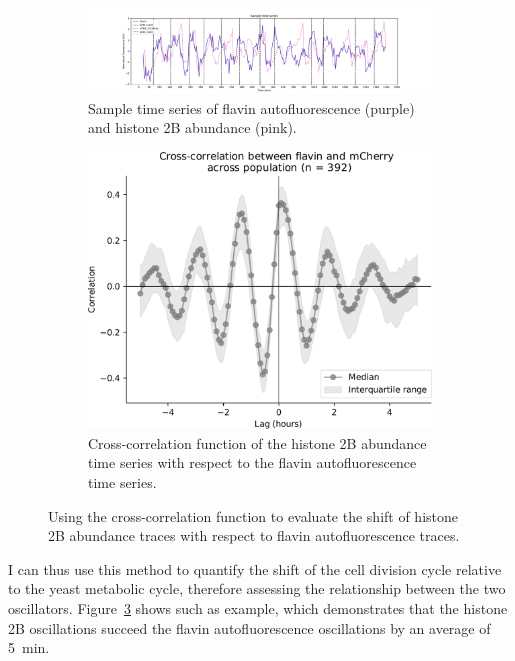 \begin{figure}
  \centering
  \begin{subfigure}[t]{0.9\textwidth}
  \centering
    \includegraphics[width=\linewidth]{htb2mCherry_26643_plots_purple_01.pdf}
    \caption{
      Sample time series of flavin autofluorescence (purple) and histone 2B abundance (pink).
    }
    \label{fig:xcf-biol-ts}
  \end{subfigure}

  \begin{subfigure}[t]{0.7\textwidth}
  \centering
    \includegraphics[width=\linewidth]{xcf_edit.pdf}
    \caption{
      Cross-correlation function of the histone 2B abundance time series with respect to the flavin autofluorescence time series.
    }
    \label{fig:xcf-biol-xcf}
  \end{subfigure}

  \caption{
    Using the cross-correlation function to evaluate the shift of histone 2B abundance traces with respect to flavin autofluorescence traces.
  }
  \label{fig:xcf-biol}
\end{figure}

I can thus use this method to quantify the shift of the cell division cycle relative to the yeast metabolic cycle, therefore assessing the relationship between the two oscillators.
Figure~\ref{fig:xcf-biol} shows such as example, which demonstrates that the histone 2B oscillations succeed the flavin autofluorescence oscillations by an average of \SI{5}{\minute}.


